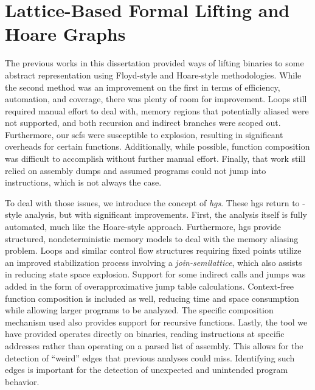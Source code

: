 \chapter{Lattice-Based Formal Lifting and Hoare Graphs}\label{ch:hg-lifting}
The previous works in this dissertation provided ways of lifting binaries to some abstract representation using Floyd-style and Hoare-style methodologies.
While the second method was an improvement on the first in terms of efficiency, automation, and coverage, there was plenty of room for improvement.
Loops still required manual effort to deal with, memory regions that potentially aliased were not supported, and both recursion and indirect branches were scoped out.
Furthermore, our \acp{scf} were susceptible to explosion, resulting in significant overheads for certain functions.
Additionally, while possible, function composition was difficult to accomplish without further manual effort.
Finally, that work still relied on assembly dumps and assumed programs could not jump into instructions, which is not always the case.

To deal with those issues, we introduce the concept of \emph{\acp{hg}}.
These \acp{hg} return to -style analysis, but with significant improvements.
First, the analysis itself is fully automated, much like the Hoare-style approach.
Furthermore, \acp{hg} provide structured, nondeterministic memory models to deal with the memory aliasing problem. 
Loops and similar control flow structures requiring fixed points utilize an improved stabilization process involving a \emph{join-semilattice}, which also assists in reducing state space explosion.
Support for some indirect calls and jumps was added in the form of overapproximative jump table calculations.
Context-free function composition is included as well, reducing time and space consumption while allowing larger programs to be analyzed.
The specific composition mechanism used also provides support for recursive functions.
Lastly, the tool we have provided operates directly on binaries, reading instructions at specific addresses rather than operating on a parsed list of assembly.
This allows for the detection of ``weird'' edges  \autocite{shapiro2013weird,dullien2017weird} that previous analyses could miss.
Identifying such edges is important for the detection of unexpected and unintended program behavior.

